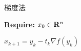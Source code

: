 \begin{algorithm}
\caption{梯度法}
\label{alg:gradient_descent}
{\bf Require:} $x_0\in {\bf R}^n$
\begin{algorithmic}[1]
	\State $x_{k+1}=y_k-t_k\nabla f(y_k)$
\EndFor
\end{algorithmic}
\end{algorithm}